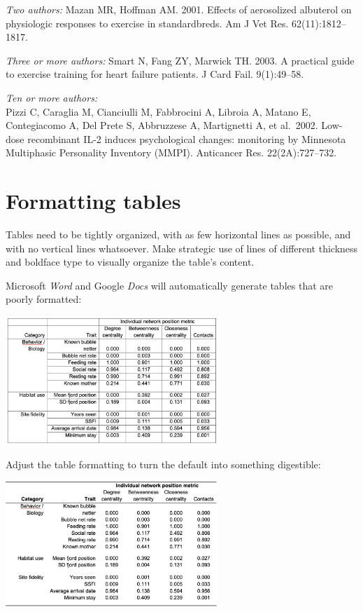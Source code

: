 \documentclass[
]{book}
\begin{document}
\emph{Two authors:}
Mazan MR, Hoffman AM. 2001. Effects of aerosolized albuterol on physiologic responses to exercise in standardbreds. Am J Vet Res. 62(11):1812--1817.

\emph{Three or more authors:}
Smart N, Fang ZY, Marwick TH. 2003. A practical guide to exercise training for heart failure patients. J Card Fail. 9(1):49--58.

\emph{Ten or more authors:}\\
Pizzi C, Caraglia M, Cianciulli M, Fabbrocini A, Libroia A, Matano E, Contegiacomo A, Del Prete S, Abbruzzese A, Martignetti A, et al.~2002. Low-dose recombinant IL-2 induces psychological changes: monitoring by Minnesota Multiphasic Personality Inventory (MMPI). Anticancer Res. 22(2A):727--732.

\hypertarget{formatting-tables}{%
\section*{Formatting tables}\label{formatting-tables}}

Tables need to be tightly organized, with as few horizontal lines as possible, and with no vertical lines whatsoever. Make strategic use of lines of different thickness and boldface type to visually organize the table's content.

Microsoft \emph{Word} and Google \emph{Docs} will automatically generate tables that are poorly formatted:

\includegraphics[width=0.6\textwidth,height=\textheight]{img/tables-lined.png}

Adjust the table formatting to turn the default into something digestible:

\includegraphics[width=0.6\textwidth,height=\textheight]{img/tables-good.png}
\end{document}
